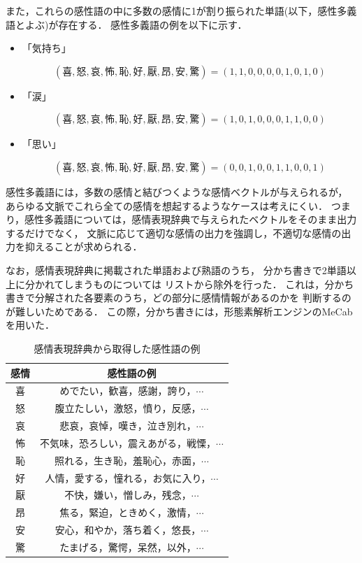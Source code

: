 			また，これらの感性語の中に多数の感情に1が割り振られた単語(以下，感性多義語とよぶ)が存在する．
			感性多義語の例を以下に示す．
			\begin{itemize}
				\item 「気持ち」
				\par $$(喜, 怒, 哀, 怖, 恥, 好, 厭, 昂, 安, 驚)=(1, 1, 0, 0, 0, 0, 1, 0, 1, 0)$$
				\item 「涙」
				\par $$(喜, 怒, 哀, 怖, 恥, 好, 厭, 昂, 安, 驚)=(1, 0, 1, 0, 0, 0, 1, 1, 0, 0)$$
				\item 「思い」
				\par $$(喜, 怒, 哀, 怖, 恥, 好, 厭, 昂, 安, 驚)=(0, 0, 1, 0, 0, 1, 1, 0, 0, 1)$$
			\end{itemize}

			感性多義語には，多数の感情と結びつくような感情ベクトルが与えられるが，
			あらゆる文脈でこれら全ての感情を想起するようなケースは考えにくい．
			つまり，感性多義語については，感情表現辞典で与えられたベクトルをそのまま出力するだけでなく，
			文脈に応じて適切な感情の出力を強調し，不適切な感情の出力を抑えることが求められる．
			
			なお，感情表現辞典に掲載された単語および熟語のうち，
			分かち書きで2単語以上に分かれてしまうものについては
			リストから除外を行った．
			これは，分かち書きで分解された各要素のうち，どの部分に感情情報があるのかを
			判断するのが難しいためである．
			この際，分かち書きには，形態素解析エンジンのMeCab\cite{mecab}を用いた．
			\begin{table}[H]
				\caption{感情表現辞典から取得した感性語の例}
				\label{table:kansei_words}
				\centering
					\begin{tabular}{cc}
						\hline
						感情 & 感性語の例 \\
						\hline \hline
						喜 & めでたい，歓喜，感謝，誇り，$\cdots$ \\
						怒 & 腹立たしい，激怒，憤り，反感，$\cdots$ \\
						哀 & 悲哀，哀悼，嘆き，泣き別れ，$\cdots$ \\
						怖 & 不気味，恐ろしい，震えあがる，戦慄，$\cdots$ \\
						恥 & 照れる，生き恥，羞恥心，赤面，$\cdots$ \\
						好 & 人情，愛する，憧れる，お気に入り，$\cdots$ \\
						厭 & 不快，嫌い，憎しみ，残念，$\cdots$ \\
						昂 & 焦る，緊迫，ときめく，激情，$\cdots$ \\
						安 & 安心，和やか，落ち着く，悠長，$\cdots$ \\
						驚 & たまげる，驚愕，呆然，以外，$\cdots$ \\
						\hline
					\end{tabular}
				\end{table}

